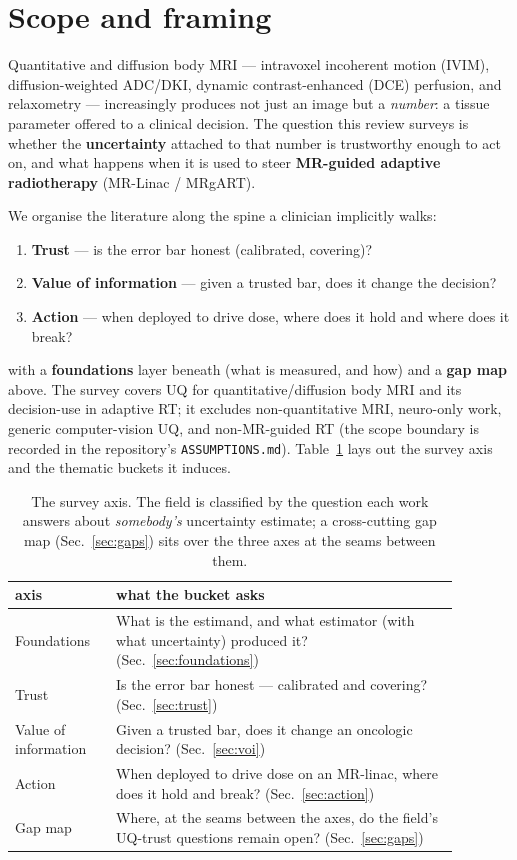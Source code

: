 \documentclass{iopjournal}
\begin{document}
\section{Scope and framing}
\label{sec:scope}

Quantitative and diffusion body MRI --- intravoxel incoherent motion (IVIM),
diffusion-weighted ADC/DKI, dynamic contrast-enhanced (DCE) perfusion, and relaxometry
--- increasingly produces not just an image but a \emph{number}: a tissue parameter
offered to a clinical decision. The question this review surveys is whether the
\textbf{uncertainty} attached to that number is trustworthy enough to act on, and what
happens when it is used to steer \textbf{MR-guided adaptive radiotherapy} (MR-Linac /
MRgART).

We organise the literature along the spine a clinician implicitly walks:

\begin{enumerate}
  \item \textbf{Trust} --- is the error bar honest (calibrated, covering)?
  \item \textbf{Value of information} --- given a trusted bar, does it change the decision?
  \item \textbf{Action} --- when deployed to drive dose, where does it hold and where does it break?
\end{enumerate}

\noindent with a \textbf{foundations} layer beneath (what is measured, and how) and a
\textbf{gap map} above. The survey covers UQ for quantitative/diffusion body MRI and its
decision-use in adaptive RT; it excludes non-quantitative MRI, neuro-only work, generic
computer-vision UQ, and non-MR-guided RT (the scope boundary is recorded in the
repository's \texttt{ASSUMPTIONS.md}). Table~\ref{tab:axis} lays out the survey axis and
the thematic buckets it induces.

\begin{table}
\caption{The survey axis. The field is classified by the question each work answers
about \emph{somebody's} uncertainty estimate; a cross-cutting gap map
(Sec.~\ref{sec:gaps}) sits over the three axes at the seams between them.}
\label{tab:axis}
\centering
\begin{tabular}{p{0.20\linewidth}p{0.68\linewidth}}
\toprule
axis & what the bucket asks \\
\midrule
Foundations & What is the estimand, and what estimator (with what uncertainty) produced it? (Sec.~\ref{sec:foundations}) \\
Trust & Is the error bar honest --- calibrated and covering? (Sec.~\ref{sec:trust}) \\
Value of information & Given a trusted bar, does it change an oncologic decision? (Sec.~\ref{sec:voi}) \\
Action & When deployed to drive dose on an MR-linac, where does it hold and break? (Sec.~\ref{sec:action}) \\
Gap map & Where, at the seams between the axes, do the field's UQ-trust questions remain open? (Sec.~\ref{sec:gaps}) \\
\bottomrule
\end{tabular}
\end{table}
\end{document}

